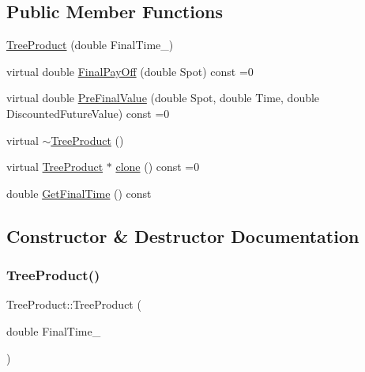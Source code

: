 \subsection*{Public Member Functions}
\begin{DoxyCompactItemize}
\item 
\hyperlink{classTreeProduct_ac7a606cd5a196a7e280549cdbc8ac5cc}{Tree\+Product} (double Final\+Time\+\_\+)
\item 
virtual double \hyperlink{classTreeProduct_acda7abc61cf6ac1b0f69a09eb0709832}{Final\+Pay\+Off} (double Spot) const =0
\item 
virtual double \hyperlink{classTreeProduct_a0b58b8acdd3759f55212c1c65361056e}{Pre\+Final\+Value} (double Spot, double Time, double Discounted\+Future\+Value) const =0
\item 
virtual \hyperlink{classTreeProduct_a05e31647f87241f2cabbd3af756a9fd6}{$\sim$\+Tree\+Product} ()
\item 
virtual \hyperlink{classTreeProduct}{Tree\+Product} $\ast$ \hyperlink{classTreeProduct_a38edda2bee3c7203e94511df96a18c32}{clone} () const =0
\item 
double \hyperlink{classTreeProduct_ad8ae61f333f08e7a9f2e24e3611263f9}{Get\+Final\+Time} () const
\end{DoxyCompactItemize}


\subsection{Constructor \& Destructor Documentation}
\hypertarget{classTreeProduct_ac7a606cd5a196a7e280549cdbc8ac5cc}{}\label{classTreeProduct_ac7a606cd5a196a7e280549cdbc8ac5cc} 
\subsubsection{\texorpdfstring{Tree\+Product()}{TreeProduct()}}
{\footnotesize\ttfamily Tree\+Product\+::\+Tree\+Product (\begin{DoxyParamCaption}\item[{double}]{Final\+Time\+\_\+ }\end{DoxyParamCaption})}

\hypertarget{classTreeProduct_a05e31647f87241f2cabbd3af756a9fd6}{}\label{classTreeProduct_a05e31647f87241f2cabbd3af756a9fd6} 
